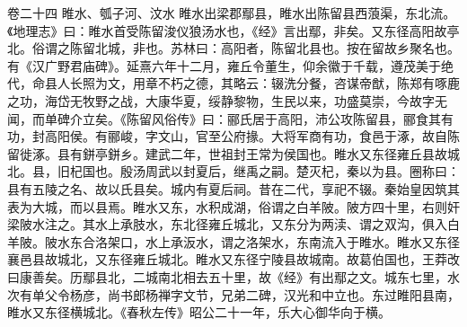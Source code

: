 \documentclass[12pt,UTF8]{ctexbook}
\begin{document}
卷二十四  睢水、瓠子河、汶水 
睢水出梁郡鄢县，睢水出陈留县西蒗渠，东北流。《地理志》曰：睢水首受陈留浚仪狼汤水也，《经》言出鄢，非矣。又东径高阳故亭北。俗谓之陈留北城，非也。苏林曰：高阳者，陈留北县也。按在留故乡聚名也。有《汉广野君庙碑》。延熹六年十二月，雍丘令董生，仰余徽于千载，遵茂美于绝代，命县人长照为文，用章不朽之德，其略云：辍洗分餐，咨谋帝猷，陈郑有啄鹿之功，海岱无牧野之战，大康华夏，绥静黎物，生民以来，功盛莫崇，今故字无闻，而单碑介立矣。《陈留风俗传》曰：郦氏居于高阳，沛公攻陈留县，郦食其有功，封高阳侯。有郦峻，字文山，官至公府掾。大将军商有功，食邑于涿，故自陈留徙涿。县有鉼亭鉼乡。建武二年，世祖封王常为侯国也。睢水又东径雍丘县故城北。县，旧杞国也。殷汤周武以封夏后，继禹之嗣。楚灭杞，秦以为县。圈称曰：县有五陵之名、故以氏县矣。城内有夏后祠。昔在二代，享祀不辍。秦始皇因筑其表为大城，而以县焉。睢水又东，水积成湖，俗谓之白羊陂。陂方四十里，右则奸梁陂水注之。其水上承肢水，东北径雍丘城北，又东分为两渎、谓之双沟，俱入白羊陂。陂水东合洛架口，水上承汳水，谓之洛架水，东南流入于睢水。睢水又东径襄邑县故城北，又东径雍丘城北。睢水又东径宁陵县故城南。故葛伯国也，王莽改曰康善矣。历鄢县北，二城南北相去五十里，故《经》有出鄢之文。城东七里，水次有单父令杨彦，尚书郎杨禅字文节，兄弟二碑，汉光和中立也。东过睢阳县南，睢水又东径横城北。《春秋左传》昭公二十一年，乐大心御华向于横。
\end{document}
